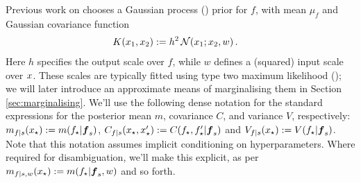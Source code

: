 \documentclass{article} %
\begin{document}
Previous work on  chooses a Gaussian process (\gp) \cite{GPsBook} prior for $f$, with mean $\mu_f$ and Gaussian covariance function 
\begin{align} \label{eq:Gaussian_cov_fn}
\textstyle
K(\lfv_1,\lfv_2)& \deq h^2\,\N{\lfv_1}{\lfv_2}{w}.
\end{align} 
Here $h$ specifies the output scale over $f$, while $w$ defines a (squared) input scale over $\lfv$.
 These scales are typically fitted using type two maximum likelihood (); we will later introduce an approximate means of marginalising them in Section \ref{sec:marginalising}. We'll use the following dense notation for the standard \gpb expressions for the posterior mean $m$, covariance $C$, and variance $V$, respectively: $\meancond{f}{\lfv_\star}{s} \deq \mean{f_\star}{\vf_s}$, $C_{f|s}(\lfv_\star, \lfv'_\star) \deq C(f_\star,f'_\star|\vf_s)$ and $\covcond{f}{\lfv_\star}{s}
\deq {\cov{f_\star}{\vf_s}}$. Note that this notation assumes implicit conditioning on hyperparameters. Where required for disambiguation, we'll make this explicit, as per $m_{f|s,w}(x\st) \deq \mean{f\st}{\vf_s, w}$ and so forth.


\end{document}
